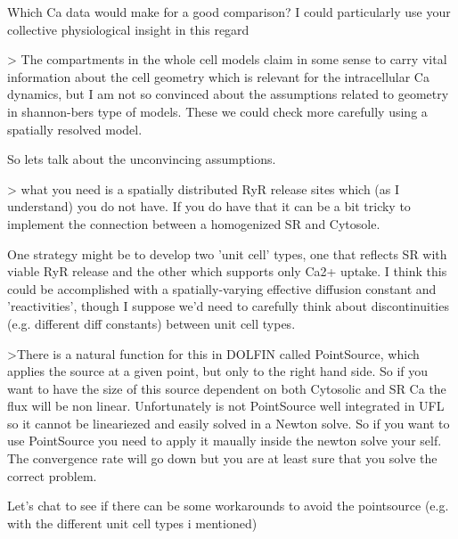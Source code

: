 Which Ca data would make for a good comparison? I could particularly use your collective physiological insight in this regard
 
 
 > The compartments in the whole cell models claim in some sense to carry vital information about the cell geometry which is relevant for the intracellular Ca dynamics, but I am not so convinced about the assumptions related to geometry in shannon-bers type of models. These we could check more carefully using a spatially resolved model. 

So lets talk about the unconvincing assumptions. 

>  what you need is a spatially distributed RyR release sites which (as I understand) you do not have. If you do have that it can be a bit tricky to implement the connection between a homogenized SR and Cytosole. 

One strategy might be to develop two 'unit cell' types, one that reflects SR with viable RyR release and the other which supports only Ca2+ uptake. I think this could be accomplished with a spatially-varying effective diffusion constant and 'reactivities', though I suppose we'd need to carefully think about discontinuities (e.g. different diff constants) between unit cell types. 

>There is a natural function for this in DOLFIN called PointSource, which applies the source at a given point, but only to the right hand side. So if you want to have the size of this source dependent on both Cytosolic and SR Ca the flux will be non linear. Unfortunately is not PointSource well integrated in UFL so it cannot be lineariezed and easily solved in a Newton solve. So if you want to use PointSource you need to apply it maually inside the newton solve your self. The convergence rate will go down but you are at least sure that you solve the correct problem.
 

Let's chat to see if there can be some workarounds to avoid the pointsource (e.g. with the different unit cell types i mentioned)